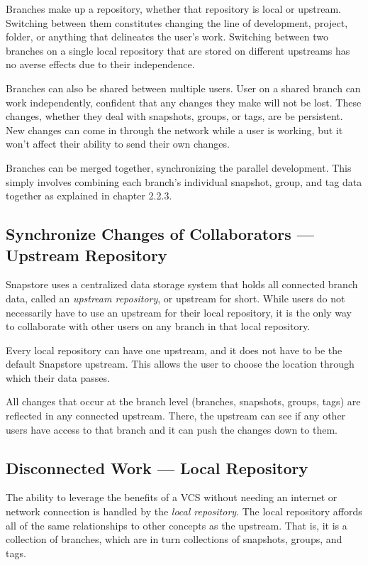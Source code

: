 Branches make up a repository, whether that repository is local or upstream. Switching between them constitutes changing the line of development, project, folder, or anything that delineates the user's work. Switching between two branches on a single local repository that are stored on different upstreams has no averse effects due to their independence.

Branches can also be shared between multiple users. User on a shared branch can work independently, confident that any changes they make will not be lost. These changes, whether they deal with snapshots, groups, or tags, are be persistent. New changes can come in through the network while a user is working, but it won't affect their ability to send their own changes.

Branches can be merged together, synchronizing the parallel development. This simply involves combining each branch's individual snapshot, group, and tag data together as explained in chapter 2.2.3.

\subsection{Synchronize Changes of Collaborators --- Upstream Repository}

Snapstore uses a centralized data storage system that holds all connected branch data, called an \textit{upstream repository}, or upstream for short. While users do not necessarily have to use an upstream for their local repository, it is the only way to collaborate with other users on any branch in that local repository.

Every local repository can have one upstream, and it does not have to be the default Snapstore upstream. This allows the user to choose the location through which their data passes.

All changes that occur at the branch level (branches, snapshots, groups, tags) are reflected in any connected upstream. There, the upstream can see if any other users have access to that branch and it can push the changes down to them.

\subsection{Disconnected Work --- Local Repository}

The ability to leverage the benefits of a VCS without needing an internet or network connection is handled by the \textit{local repository}. The local repository affords all of the same relationships to other concepts as the upstream. That is, it is a collection of branches, which are in turn collections of snapshots, groups, and tags.


